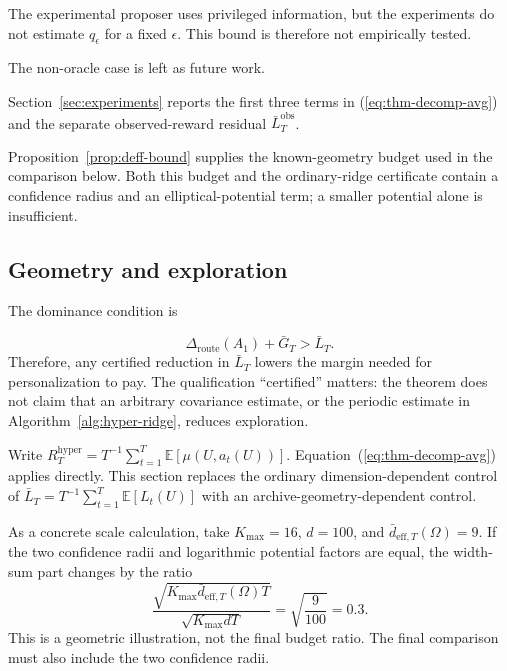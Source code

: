 \documentclass{article} %
\providecommand{\Droute}{\Delta_{\mathrm{route}}}
\renewcommand{\eqref}[1]{\textup{(\ref{#1})}}
\begin{document}
The experimental proposer uses privileged information, but the experiments do not
estimate \(q_\epsilon\) for a fixed \(\epsilon\). This bound is therefore not
empirically tested.

The non-oracle case is left as future work.

Section~\ref{sec:experiments} reports the first three terms in
\eqref{eq:thm-decomp-avg} and the separate observed-reward residual
\(\bar L_T^{\mathrm{obs}}\).

Proposition~\ref{prop:deff-bound} supplies the known-geometry budget used in
the comparison below. Both this budget and the ordinary-ridge certificate
contain a confidence radius and an elliptical-potential term; a smaller
potential alone is insufficient.

\subsection{Geometry and exploration}

The dominance condition is

\begin{equation}
\Droute(A_1) + \bar{G}_T > \bar{L}_T .
\end{equation}
Therefore, any certified reduction in $\bar L_T$ lowers the margin needed for
personalization to pay. The qualification ``certified'' matters: the theorem
does not claim that an arbitrary covariance estimate, or the periodic estimate
in Algorithm~\ref{alg:hyper-ridge}, reduces exploration.




Write
\(R_T^{\mathrm{hyper}}
=T^{-1}\sum_{t=1}^{T}\mathbb{E}[\mu(U,a_t(U))]\).
Equation~\eqref{eq:thm-decomp-avg} applies directly. This section replaces the
ordinary dimension-dependent control of
\(\bar L_T=T^{-1}\sum_{t=1}^{T}\mathbb{E}[L_t(U)]\)
with an archive-geometry-dependent control.

As a concrete scale calculation, take \(K_{\max}=16\), \(d=100\), and
\(\bar d_{\mathrm{eff},T}(\Omega)=9\).
If the two confidence radii and logarithmic potential factors are equal, the width-sum part changes by the ratio
\begin{equation}
\label{eq:hyper-example-ratio}
\frac{
\sqrt{K_{\max}\bar d_{\mathrm{eff},T}(\Omega)T}
}{
\sqrt{K_{\max}dT}
}
=
\sqrt{\frac{9}{100}}
=
0.3.
\end{equation}
This is a geometric illustration, not the final budget ratio. The final comparison must also include the two confidence radii.
\end{document}
